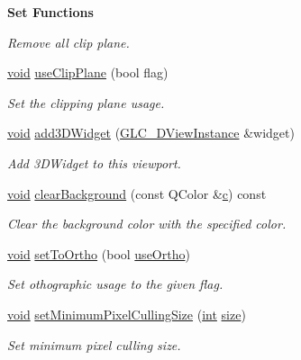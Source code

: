 \begin{Indent}{\bf Set Functions}
\begin{DoxyCompactItemize}
\begin{DoxyCompactList}\small\item\em Remove all clip plane. \end{DoxyCompactList}\item 
\hyperlink{group___u_a_v_objects_plugin_ga444cf2ff3f0ecbe028adce838d373f5c}{void} \hyperlink{class_g_l_c___viewport_a4658cbcae8d55c9ce0c88195ad064674}{use\-Clip\-Plane} (bool flag)
\begin{DoxyCompactList}\small\item\em Set the clipping plane usage. \end{DoxyCompactList}\item 
\hyperlink{group___u_a_v_objects_plugin_ga444cf2ff3f0ecbe028adce838d373f5c}{void} \hyperlink{class_g_l_c___viewport_aadaa6f3ff019e910939a8d864609ca40}{add3\-D\-Widget} (\hyperlink{class_g_l_c__3_d_view_instance}{G\-L\-C\-\_\-D\-View\-Instance} \&widget)
\begin{DoxyCompactList}\small\item\em Add 3\-D\-Widget to this viewport. \end{DoxyCompactList}\item 
\hyperlink{group___u_a_v_objects_plugin_ga444cf2ff3f0ecbe028adce838d373f5c}{void} \hyperlink{class_g_l_c___viewport_a65b16e9a2dc989c101cac23bf13ccf20}{clear\-Background} (const Q\-Color \&\hyperlink{glext_8h_a1f2d7f8147412c43ba2303a56f97ee73}{c}) const 
\begin{DoxyCompactList}\small\item\em Clear the background color with the specified color. \end{DoxyCompactList}\item 
\hyperlink{group___u_a_v_objects_plugin_ga444cf2ff3f0ecbe028adce838d373f5c}{void} \hyperlink{class_g_l_c___viewport_aab6fc1073a270fc0f1230be81e6848fa}{set\-To\-Ortho} (bool \hyperlink{class_g_l_c___viewport_a0dda1e477c8c17ee8bb35f57284e00e7}{use\-Ortho})
\begin{DoxyCompactList}\small\item\em Set othographic usage to the given flag. \end{DoxyCompactList}\item 
\hyperlink{group___u_a_v_objects_plugin_ga444cf2ff3f0ecbe028adce838d373f5c}{void} \hyperlink{class_g_l_c___viewport_a721c5c38529323b1e7f6c19c31afd779}{set\-Minimum\-Pixel\-Culling\-Size} (\hyperlink{ioapi_8h_a787fa3cf048117ba7123753c1e74fcd6}{int} \hyperlink{glext_8h_a014d89bd76f74ef3a29c8f04b473eb76}{size})
\begin{DoxyCompactList}\small\item\em Set minimum pixel culling size. \end{DoxyCompactList}\end{DoxyCompactItemize}
\end{Indent}
